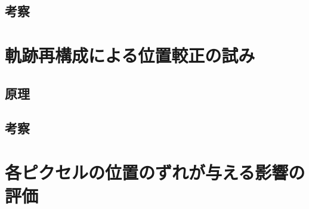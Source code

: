 \documentclass[Yonemoto_master.tex]{subfiles}
\begin{document}
\subsection{考察}

\section{軌跡再構成による位置較正の試み}
\subsection{原理}
\subsection{考察}

\section{各ピクセルの位置のずれが与える影響の評価}
\end{document}
